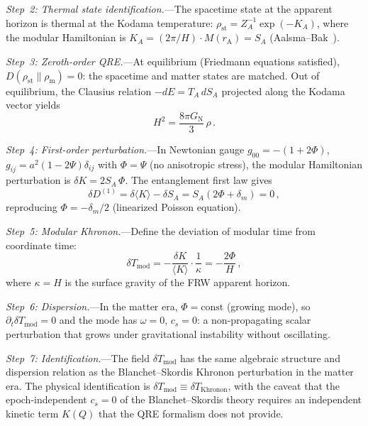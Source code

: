 \documentclass[prd,twocolumn,superscriptaddress,longbibliography,floatfix]{revtex4-2}
\newcommand{\rhost}{\rho_{\mathrm{st}}}
\newcommand{\rhom}{\rho_{\mathrm{m}}}
\newcommand{\Tmod}{T_{\mathrm{mod}}}
\newcommand{\GN}{G_{\mathrm{N}}}
\newcommand{\rA}{r_{\mathrm{A}}}
\begin{document}
\emph{Step~2: Thermal state identification.}---The
spacetime state at the apparent horizon is thermal
at the Kodama temperature:
$\rhost = Z_A^{-1}\exp(-K_A)$,
where the modular Hamiltonian is
$K_A = (2\pi/H)\cdot M(\rA) = S_A$
(Aalsma--Bak~\cite{AalsmaBak2025}).

\emph{Step~3: Zeroth-order QRE.}---At equilibrium
(Friedmann equations satisfied),
$D(\rhost\|\rhom) = 0$: the spacetime and matter
states are matched.  Out of equilibrium, the
Clausius relation $-dE = T_A\,dS_A$ projected along
the Kodama vector yields~\cite{CaiKim2005}
\begin{equation}
H^2 = \frac{8\pi\GN}{3}\,\rho\,.
\end{equation}

\emph{Step~4: First-order perturbation.}---In
Newtonian gauge
$g_{00} = -(1+2\Phi)$,
$g_{ij} = a^2(1-2\Psi)\delta_{ij}$
with $\Phi = \Psi$ (no anisotropic stress), the
modular Hamiltonian perturbation is
$\delta K = 2S_A\,\Phi$.
The entanglement first law gives
\begin{equation}
\delta D^{(1)} = \delta\langle K\rangle - \delta S_A
= S_A(2\Phi + \delta_m) = 0\,,
\end{equation}
reproducing $\Phi = -\delta_m/2$ (linearized
Poisson equation).

\emph{Step~5: Modular Khronon.}---Define the
deviation of modular time from coordinate time:
\begin{equation}
\delta\Tmod = -\frac{\delta K}{\langle K\rangle}
\cdot\frac{1}{\kappa}
= -\frac{2\Phi}{H}\,,
\end{equation}
where $\kappa = H$ is the surface gravity of
the FRW apparent horizon.

\emph{Step~6: Dispersion.}---In the matter era,
$\Phi = \mathrm{const}$ (growing mode), so
$\partial_t\delta\Tmod = 0$ and the mode has
$\omega = 0$, $c_s = 0$: a non-propagating
scalar perturbation that grows under gravitational
instability without oscillating.

\emph{Step~7: Identification.}---The field
$\delta\Tmod$ has the same algebraic structure and
dispersion relation as the Blanchet--Skordis
Khronon perturbation in the matter era.  The
physical identification is
$\delta\Tmod \equiv \delta T_{\mathrm{Khronon}}$,
with the caveat that the epoch-independent
$c_s = 0$ of the Blanchet--Skordis theory
requires an independent kinetic term $K(Q)$ that
the QRE formalism does not provide.
\end{document}
